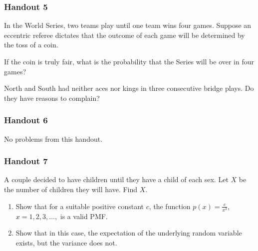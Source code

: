 \subsubsection{Handout 5}
\begin{problem}[Handout 5, \# 6]
  In the World Series, two teams play until one team wins four
  games. Suppose an eccentric referee dictates that the outcome of each
  game will be determined by the toss of a coin.

  \noindent If the coin is truly fair, what is the probability that the
  Series will be over in four games?
\end{problem}
\begin{solution*}
\end{solution*}

\begin{problem}[Handout 5, \# 14]
  North and South had neither aces nor kings in three consecutive bridge
  plays. Do they have reasons to complain?
\end{problem}
\begin{solution*}
\end{solution*}

\subsubsection{Handout 6}
No problems from this handout.

\subsubsection{Handout 7}
\begin{problem}[Handout 7, \# 5]
  A couple decided to have children until they have a child of each
  sex. Let \(X\) be the number of children they will have. Find \(X\).
\end{problem}
\begin{solution*}
\end{solution*}

\begin{problem}[Handout 7, \# 8]
  \begin{enumerate}[label=(\alph*),noitemsep]
  \item Show that for a suitable positive constant \(c\), the function
    \(p(x)=\frac{c}{x^3}\), \(x=1,2,3,\dotsc,\) is a valid PMF.
  \item Show that in this case, the expectation of the underlying random
    variable exists, but the variance does not.
  \end{enumerate}
\end{problem}
\begin{solution*}
\end{solution*}

